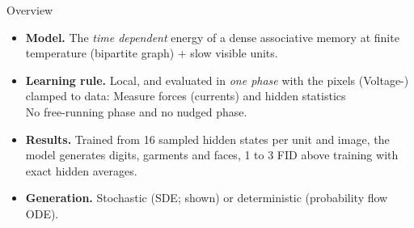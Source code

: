 \documentclass[aspectratio=169,10pt]{beamer}
\newcommand{\key}[1]{{\color{cyan}\bfseries #1}}
\begin{document}
\begin{frame}{Overview}
  \begin{itemize}\setlength{\itemsep}{9pt}
    \item \key{Model.}  The \textit{time dependent} energy of a dense associative memory at finite temperature (bipartite graph) + slow visible units.\\
    \item \key{Learning rule.} Local, and evaluated in \emph{one phase} with the pixels
      (Voltage-) clamped to data:  Measure forces (currents) and hidden statistics\\
      No free-running phase and no nudged phase.
    \item \key{Results.} Trained from 16 sampled hidden states per unit and image, the
      model generates digits, garments and faces, 1 to 3 FID above training with exact
      hidden averages.
    
    \item \key{Generation.} Stochastic (SDE; shown) or deterministic (probability flow ODE).
  \end{itemize}
\end{frame}
\end{document}
